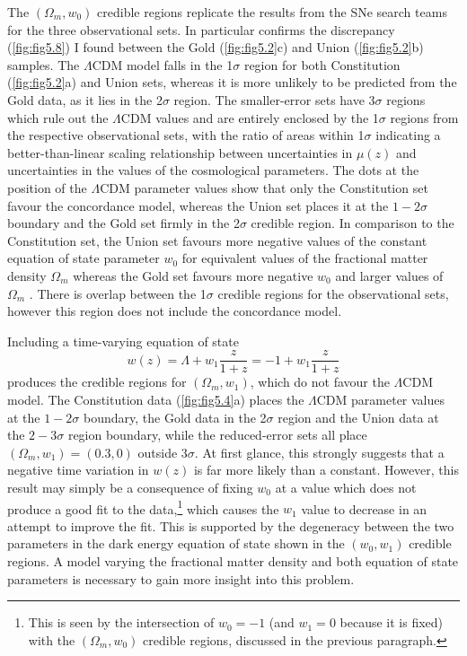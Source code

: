 The $(\Omega_m , w_0)$ credible regions replicate the results from the SNe search teams for the three observational sets. In particular \cite{Kowalski2008} confirms the discrepancy (\cref{fig:fig5.8}) I found between the Gold (\cref{fig:fig5.2}c) and Union (\cref{fig:fig5.2}b) samples. 
The $\Lambda$CDM model falls in the 1$\sigma$ region for both Constitution (\cref{fig:fig5.2}a) and Union sets, whereas it is more unlikely to be predicted from the Gold data, as it lies in the 2$\sigma$ region. The smaller-error sets have 3$\sigma$ regions which rule out the $\Lambda$CDM values and are entirely enclosed by the 1$\sigma$ regions from the respective observational sets, with the ratio of areas within 1$\sigma$ indicating a better-than-linear scaling relationship between uncertainties in $\mu(z)$ and uncertainties in the values of the cosmological parameters. The dots at the position of the $\Lambda$CDM parameter values show that only the Constitution set favour the concordance model, whereas the Union set places it at the $1-2\sigma$ boundary and the Gold set firmly in the 2$\sigma$ credible region. 
In comparison to the Constitution set, the Union set favours more negative values of the constant equation of state parameter $w_0$ for equivalent values of the fractional matter density $\Omega_m$ whereas the Gold set favours more negative $w_0$ and larger values of $\Omega_m$ . There is overlap between the 1$\sigma$ credible regions for the observational sets, however this region does not include the concordance model.

Including a time-varying equation of state 
\begin{equation*}
w(z) = \Lambda + w_1 \frac{z}{1+z} = -1 + w_1 \frac{z}{1+z}    
\end{equation*}
produces the credible regions for $(\Omega_m , w_1)$, which do not favour the $\Lambda$CDM model. 
The Constitution data (\cref{fig:fig5.4}a) places the $\Lambda$CDM parameter values at the $1 - 2\sigma$ boundary, the Gold data in the 2$\sigma$ region and the Union data at the $2-3\sigma$ region boundary, while the reduced-error sets all place $(\Omega_m , w_1) = (0.3, 0)$ outside 3$\sigma$. 
At first glance, this strongly suggests that a negative time variation in $w(z)$ is far more likely than a constant. However, this result may simply be a consequence of fixing $w_0$ at a value which does not produce a good fit to the data,\footnote{This is seen by the intersection of $w_0 = -1$ (and $w_1 = 0$ because it is fixed) with the $(\Omega_m , w_0)$ credible regions, discussed in the previous paragraph.} which causes the $w_1$ value to decrease in an attempt to improve the fit. This is supported by the degeneracy between the two parameters in the dark energy equation of state shown in the $(w_0 , w_1)$ credible regions. A model varying the fractional matter density and both equation of state parameters is necessary to gain more insight into this problem.

